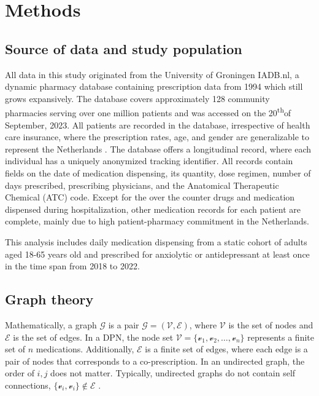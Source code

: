 \documentclass[
  authoryear,
  review]{elsarticle}
\begin{document}
\section{Methods}\label{methods}

\subsection{Source of data and study
population}\label{source-of-data-and-study-population}

All data in this study originated from the University of Groningen
IADB.nl, a dynamic pharmacy database containing prescription data from
1994 which still grows expansively. The database covers approximately
128 community pharmacies serving over one million patients and was
accessed on the 20\textsuperscript{th}of September, 2023. All patients
are recorded in the database, irrespective of health care insurance,
where the prescription rates, age, and gender are generalizable to
represent the Netherlands \citep{Visser2013}. The database offers a
longitudinal record, where each individual has a uniquely anonymized
tracking identifier. All records contain fields on the date of
medication dispensing, its quantity, dose regimen, number of days
prescribed, prescribing physicians, and the Anatomical Therapeutic
Chemical (ATC) code. Except for the over the counter drugs and
medication dispensed during hospitalization, other medication records
for each patient are complete, mainly due to high patient-pharmacy
commitment in the Netherlands.

This analysis includes daily medication dispensing from a static cohort
of adults aged 18-65 years old and prescribed for anxiolytic or
antidepressant at least once in the time span from 2018 to 2022.

\subsection{Graph theory}\label{graph-theory}

Mathematically, a graph \(\mathcal{G}\) is a pair
\(\mathcal{G} = (\mathcal{V}, \mathcal{E})\), where \(\mathcal{V}\) is
the set of nodes and \(\mathcal{E}\) is the set of edges. In a DPN, the
node set
\(\mathcal{V} = \{\mathcal{v}_1, \mathcal{v}_2, \dots, \mathcal{v}_n\}\)
represents a finite set of \(n\) medications. Additionally,
\(\mathcal{E}\) is a finite set of edges, where each edge is a pair of
nodes that corresponds to a co-prescription. In an undirected graph, the
order of \(i, j\) does not matter. Typically, undirected graphs do not
contain self connections,
\(\{\mathcal{v}_i, \mathcal{v}_i\} \notin \mathcal{E}\)
\citep{estrada2012structure}.
\end{document}
